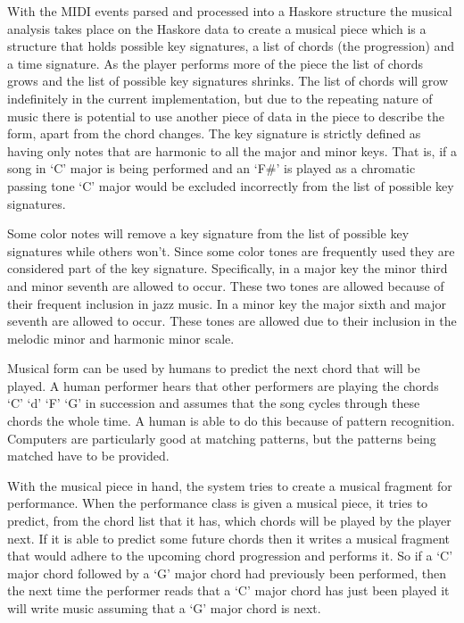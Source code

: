 \documentclass[12pt]{ucthesis}
\begin{document}
With the MIDI events parsed and processed into a Haskore structure the musical analysis takes place on the Haskore data to create a musical piece which is a structure that holds possible key signatures, a list of chords (the progression) and a time signature. As the player performs more of the piece the list of chords grows and the list of possible key signatures shrinks. The list of chords will grow indefinitely in the current implementation, but due to the repeating nature of music there is potential to use another piece of data in the piece to describe the form, apart from the chord changes. The key signature is strictly defined as having only notes that are harmonic to all the major and minor keys. That is, if a song in `C' major is being performed and an `F\#' is played as a chromatic passing tone `C' major would be excluded incorrectly from the list of possible key signatures. 

Some color notes will remove a key signature from the list of possible key signatures while others won't. Since some color tones are frequently used they are considered part of the key signature.  Specifically, in a major key the minor third and minor seventh are allowed to occur. These two tones are allowed because of their frequent inclusion in jazz music. In a minor key the major sixth and major seventh are allowed to occur. These tones are allowed due to their inclusion in the melodic minor and harmonic minor scale. 

Musical form can be used by humans to predict the next chord that will be played. A human performer hears that other performers are playing the chords `C' `d' `F' `G' in succession and assumes that the song cycles through these chords the whole time. A human is able to do this because of pattern recognition. Computers are particularly good at matching patterns, but the patterns being matched have to be provided.

With the musical piece in hand, the system tries to create a musical fragment for performance. When the performance class is given a musical piece, it tries to predict, from the chord list that it has, which chords will be played by the player next. If it is able to predict some future chords then it writes a musical fragment that would adhere to the upcoming chord progression and performs it. So if a `C' major chord followed by a `G' major chord had previously been performed, then the next time the performer reads that a `C' major chord has just been played it will write music assuming that a `G' major chord is next. 
\end{document}
